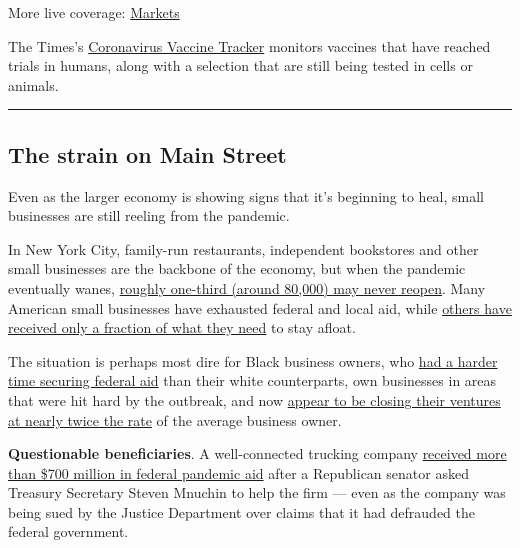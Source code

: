 More live coverage:
\href{https://www.nytimes3xbfgragh.onion/live/2020/08/04/business/stock-market-today-coronavirus?action=click\&pgtype=Article\&state=default\&region=MAIN_CONTENT_1\&context=storylines_live_updates}{Markets}

The Times's
\href{https://www.nytimes3xbfgragh.onion/interactive/2020/science/coronavirus-vaccine-tracker.html}{Coronavirus
Vaccine Tracker} monitors vaccines that have reached trials in humans,
along with a selection that are still being tested in cells or animals.

\begin{center}\rule{0.5\linewidth}{\linethickness}\end{center}

\hypertarget{the-strain-on-main-street}{%
\subsection{The strain on Main Street}\label{the-strain-on-main-street}}

Even as the larger economy is showing signs that it's beginning to heal,
small businesses are still reeling from the pandemic.

In New York City, family-run restaurants, independent bookstores and
other small businesses are the backbone of the economy, but when the
pandemic eventually wanes,
\href{https://www.nytimes3xbfgragh.onion/2020/08/03/nyregion/nyc-small-businesses-closing-coronavirus.html}{roughly
one-third (around 80,000) may never reopen}. Many American small
businesses have exhausted federal and local aid, while
\href{https://www.nytimes3xbfgragh.onion/2020/08/03/business/small-business-loans-coronavirus.html?action=click\&module=RelatedLinks\&pgtype=Article}{others
have received only a fraction of what they need} to stay afloat.

The situation is perhaps most dire for Black business owners, who
\href{https://www.nytimes3xbfgragh.onion/2020/07/15/business/paycheck-protection-program-bias.html}{had
a harder time securing federal aid} than their white counterparts, own
businesses in areas that were hit hard by the outbreak, and now
\href{https://www.nytimes3xbfgragh.onion/live/2020/08/04/business/stock-market-today-coronavirus\#black-owned-businesses-face-a-double-blow-as-the-pandemic-strikes-minority-communities}{appear
to be closing their ventures at nearly twice the rate} of the average
business owner.

\textbf{Questionable beneficiaries}. A well-connected trucking company
\href{https://www.nytimes3xbfgragh.onion/2020/08/03/us/politics/yrc-coronavirus-relief-funds.html}{received
more than \$700 million in federal pandemic aid} after a Republican
senator asked Treasury Secretary Steven Mnuchin to help the firm ---
even as the company was being sued by the Justice Department over claims
that it had defrauded the federal government.


